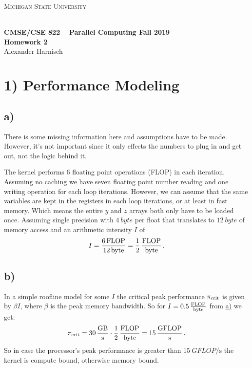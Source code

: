 \documentclass[a4paper, 11pt]{article}
\begin{document}
\noindent
\centerline{\small{\textsc{Michigan State University}}} \\
\large{\textbf{CMSE/CSE 822 – Parallel Computing \hfill Fall 2019 \\
Homework 2}} \\
Alexander Harnisch \\
\noindent\makebox[\linewidth]{\rule{\textwidth}{0.4pt}}

\section*{1) Performance Modeling}
\subsection*{a)}
\label{sec:1a}
There is some missing information here and assumptions have to be made.
However, it's not important since it only effects the numbers to plug in and
get out, not the logic behind it.

The kernel performs 6 floating point operations (FLOP) in each iteration.
Assuming no caching we have seven floating point number reading and one writing
operation for each loop iterations. However, we can assume that the same
variables are kept in the registers in each loop iterations, or at least in
fast memory. Which means the entire $y$ and $z$ arrays both only have to be
loaded once. Assuming single precision with $\SI{4}{byte}$ per float that
translates to $\SI{12}{byte}$ of memory access and an arithmetic intensity $I$
of
\begin{equation}
  I = \frac{\SI{6}{FLOP}}{\SI{12}{byte}} = \frac{1}{2}\,\frac{\textup{FLOP}}{\textup{byte}}\,.
\end{equation}

\subsection*{b)}
In a simple roofline model for some $I$ the critical peak performance
$\pi_\textup{crit}$ is given by $\beta I$, where $\beta$ is the peak memory
bandwidth. So for $I = 0.5\,\frac{\textup{FLOP}}{\textup{byte}}$ from
\hyperref[sec:1a]{a)} we get:
\begin{equation}
  \pi_\textup{crit} = 30\,\frac{\textup{GB}}{\textup{s}}\cdot \frac{1}{2}\,\frac{\textup{FLOP}}{\textup{byte}} = 15\,\frac{\textup{GFLOP}}{\textup{s}}\,.
\end{equation}
So in case the processor's peak performance is greater than
$\SI{15}{GFLOP\per\second}$ the kernel is compute bound, otherwise
memory bound.
\end{document}
